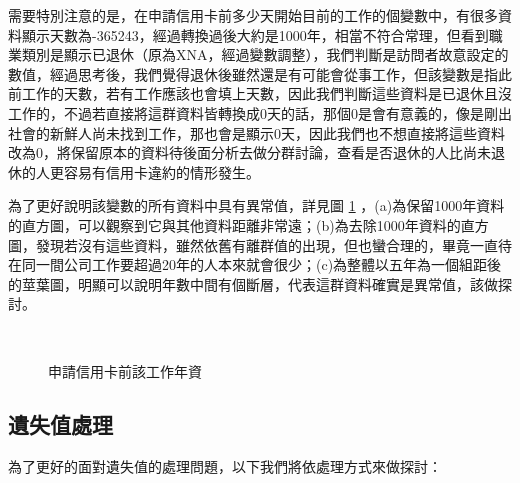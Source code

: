 \documentclass[12pt, a4paper]{article}
\begin{document}
需要特別注意的是，在申請信用卡前多少天開始目前的工​​作的個變數中，有很多資料顯示天數為-365243，經過轉換過後大約是1000年，相當不符合常理，但看到職業類別是顯示已退休（原為XNA，經過變數調整），我們判斷是訪問者故意設定的數值，經過思考後，我們覺得退休後雖然還是有可能會從事工作，但該變數是指此前工作的天數，若有工作應該也會填上天數，因此我們判斷這些資料是已退休且沒工作的，不過若直接將這群資料皆轉換成0天的話，那個0是會有意義的，像是剛出社會的新鮮人尚未找到工作，那也會是顯示0天，因此我們也不想直接將這些資料改為0，將保留原本的資料待後面分析去做分群討論，查看是否退休的人比尚未退休的人更容易有信用卡違約的情形發生。

為了更好說明該變數的所有資料中具有異常值，詳見圖 \ref{fig:申請信用卡前該工作年資} ，(a)為保留1000年資料的直方圖，可以觀察到它與其他資料距離非常遠；(b)為去除1000年資料的直方圖，發現若沒有這些資料，雖然依舊有離群值的出現，但也蠻合理的，畢竟一直待在同一間公司工作要超過20年的人本來就會很少；(c)為整體以五年為一個組距後的莖葉圖，明顯可以說明年數中間有個斷層，代表這群資料確實是異常值，該做探討。

\begin{figure} [h]
    \centering
    \hspace{0.5cm} 
    \hspace{0.5cm}\\ 
    \caption{申請信用卡前該工作年資}\label{fig:申請信用卡前該工作年資}
\end{figure}

\subsection{遺失值處理}

為了更好的面對遺失值的處理問題，以下我們將依處理方式來做探討：
\end{document}
